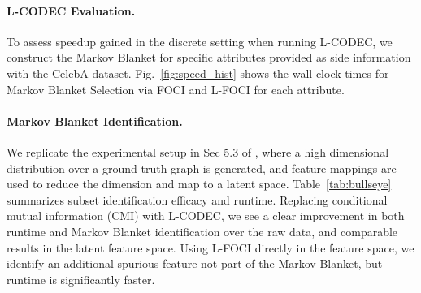 \paragraph{L-CODEC Evaluation.}
To assess speedup gained in the discrete setting when running L-CODEC,
we construct the Markov Blanket for specific attributes provided as side information with the CelebA dataset. Fig.~\ref{fig:speed_hist} shows the wall-clock times for Markov Blanket Selection via FOCI and L-FOCI for each attribute.

\paragraph{Markov Blanket Identification.} We replicate the experimental setup in Sec 5.3 of \cite{bullseye}, where a high dimensional distribution over a ground truth graph is generated, and feature mappings are used to reduce the dimension and map to a latent space. Table~\ref{tab:bullseye} summarizes subset identification efficacy and runtime. Replacing conditional mutual information (CMI) with L-CODEC, we see a clear improvement in both runtime and Markov Blanket identification over the raw data, and comparable results in the latent feature space. Using L-FOCI directly in the feature space, we identify an additional spurious feature not part of the Markov Blanket, but runtime is significantly faster.
